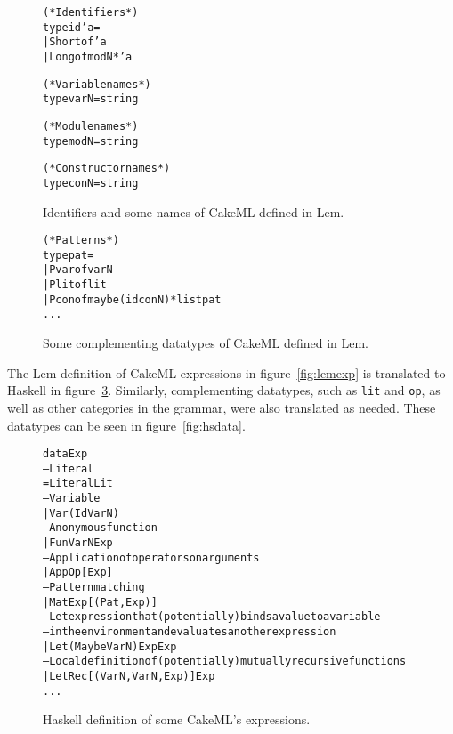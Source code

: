 \begin{figure}
\begin{alltt}
  (* Identifiers *)
  type id 'a =
    | Short of 'a
    | Long of modN * 'a


  (* Variable names *)
  type varN = string

  (* Module names *)
  type modN = string

  (* Constructor names *)
  type conN = string

\end{alltt}
\caption{Identifiers and some names of CakeML defined in Lem.}
\label{fig:lemid}
\end{figure}

\begin{figure}
\begin{alltt}
  (* Patterns *)
  type pat =
    | Pvar of varN
    | Plit of lit
    | Pcon of maybe (id conN) * list pat
    ...
\end{alltt}
\caption{Some complementing datatypes of CakeML defined in Lem.}
\label{fig:lempat}
\end{figure}

The Lem definition of CakeML expressions in figure~\ref{fig:lemexp} is
translated to Haskell in figure~\ref{fig:hsexp}.
Similarly, complementing datatypes, such as \texttt{lit} and
\texttt{op}, as well as other categories in the grammar, were also translated
as needed. These datatypes can be seen in figure~\ref{fig:hsdata}.

\begin{figure}
\begin{alltt}
  data Exp
    -- Literal
    = Literal Lit
    -- Variable
    | Var (Id VarN)
    -- Anonymous function
    | Fun VarN Exp
    -- Application of operators on arguments
    | App Op [Exp]
    -- Pattern matching
    | Mat Exp [(Pat, Exp)]
    -- Let expression that (potentially) binds a value to a variable
    -- in the environment and evaluates another expression
    | Let (Maybe VarN) Exp Exp
    -- Local definition of (potentially) mutually recursive functions
    | LetRec [(VarN, VarN, Exp)] Exp
    ...
\end{alltt}
\caption{Haskell definition of some CakeML's expressions.}
\label{fig:hsexp}
\end{figure}

